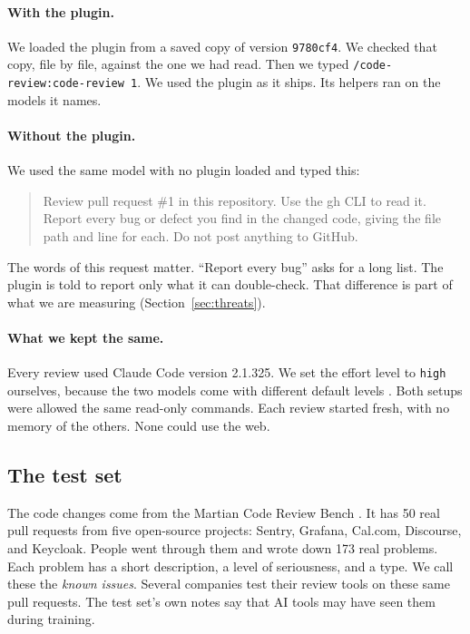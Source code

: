 \documentclass[11pt]{article}
\begin{document}
\paragraph{With the plugin.} We loaded the plugin from a saved copy of version \texttt{9780cf4}. We checked that copy, file by file, against the one we had read. Then we typed \texttt{/code-review:code-review 1}. We used the plugin as it ships. Its helpers ran on the models it names.

\paragraph{Without the plugin.} We used the same model with no plugin loaded and typed this:

\begin{quote}\small
Review pull request \#1 in this repository. Use the gh CLI to read it. Report every bug or defect you find in the changed code, giving the file path and line for each. Do not post anything to GitHub.
\end{quote}

The words of this request matter. ``Report every bug'' asks for a long list. The plugin is told to report only what it can double-check. That difference is part of what we are measuring (Section~\ref{sec:threats}).

\paragraph{What we kept the same.} Every review used Claude Code version 2.1.325. We set the effort level to \texttt{high} ourselves, because the two models come with different default levels \citep{anthropic2026effort}. Both setups were allowed the same read-only commands. Each review started fresh, with no memory of the others. None could use the web.

\subsection{The test set}

The code changes come from the Martian Code Review Bench \citep{martian2026bench}. It has 50 real pull requests from five open-source projects: Sentry, Grafana, Cal.com, Discourse, and Keycloak. People went through them and wrote down 173 real problems. Each problem has a short description, a level of seriousness, and a type. We call these the \emph{known issues}. Several companies test their review tools on these same pull requests. The test set's own notes say that AI tools may have seen them during training.
\end{document}
